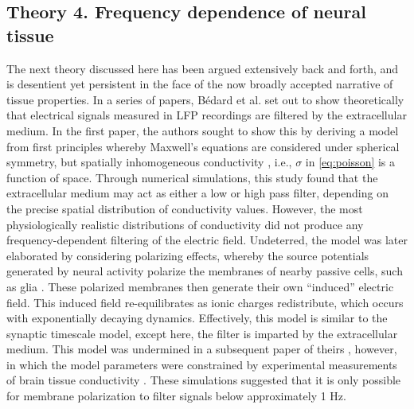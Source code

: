 \subsection{Theory 4. Frequency dependence of neural tissue} \label{sec:filter_theory}
The next theory discussed here has been argued extensively back and forth, and is desentient yet persistent in the face of the now broadly accepted narrative of tissue properties. In a series of papers, Bédard et al.\cite{Bedard2004, Bedard2006a, Bedard2009} set out to show theoretically that electrical signals measured in LFP recordings are filtered by the extracellular medium. In the first paper, the authors sought to show this by deriving a model from first principles whereby Maxwell’s equations are considered under spherical symmetry, but spatially inhomogeneous conductivity \cite{Bedard2004}, i.e., $\sigma$ in \ref{eq:poisson} is a function of space. Through numerical simulations, this study found that the extracellular medium may act as either a low or high pass filter, depending on the precise spatial distribution of conductivity values. However, the most physiologically realistic distributions of conductivity did not produce any frequency-dependent filtering of the electric field. Undeterred, the model was later elaborated by considering polarizing effects, whereby the source potentials generated by neural activity polarize the membranes of nearby passive cells, such as glia \cite{Bedard2006a}. These polarized membranes then generate their own ``induced'' electric field. This induced field re-equilibrates as ionic charges redistribute, which occurs with exponentially decaying dynamics. Effectively, this model is similar to the synaptic timescale model, except here, the filter is imparted by the extracellular medium. This model was undermined in a subsequent paper of theirs \cite{Bedard2009}, however, in which the model parameters were constrained by experimental measurements of brain tissue conductivity \cite{Gabriel1996}. These simulations suggested that it is only possible for membrane polarization to filter signals below approximately 1 Hz.

